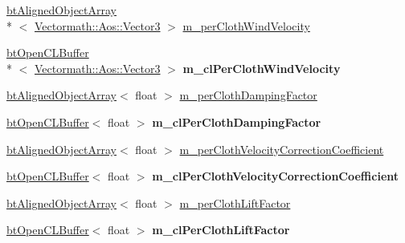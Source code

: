 \begin{DoxyCompactItemize}
\item 
\hyperlink{classbt_aligned_object_array}{bt\+Aligned\+Object\+Array}\\*
$<$ \hyperlink{class_vectormath_1_1_aos_1_1_vector3}{Vectormath\+::\+Aos\+::\+Vector3} $>$ \hyperlink{classbt_open_c_l_soft_body_solver_a35942277432e994af4343e05746badf6}{m\+\_\+per\+Cloth\+Wind\+Velocity}
\item 
\hypertarget{classbt_open_c_l_soft_body_solver_ac2943803f63a8436fbc6ccff46f09f85}{\hyperlink{classbt_open_c_l_buffer}{bt\+Open\+C\+L\+Buffer}\\*
$<$ \hyperlink{class_vectormath_1_1_aos_1_1_vector3}{Vectormath\+::\+Aos\+::\+Vector3} $>$ {\bfseries m\+\_\+cl\+Per\+Cloth\+Wind\+Velocity}}\label{classbt_open_c_l_soft_body_solver_ac2943803f63a8436fbc6ccff46f09f85}

\item 
\hyperlink{classbt_aligned_object_array}{bt\+Aligned\+Object\+Array}$<$ float $>$ \hyperlink{classbt_open_c_l_soft_body_solver_aadcf2cae029a38caf6251ef3546eaae9}{m\+\_\+per\+Cloth\+Damping\+Factor}
\item 
\hypertarget{classbt_open_c_l_soft_body_solver_a90caa19599f9fc38d2c635e945004780}{\hyperlink{classbt_open_c_l_buffer}{bt\+Open\+C\+L\+Buffer}$<$ float $>$ {\bfseries m\+\_\+cl\+Per\+Cloth\+Damping\+Factor}}\label{classbt_open_c_l_soft_body_solver_a90caa19599f9fc38d2c635e945004780}

\item 
\hyperlink{classbt_aligned_object_array}{bt\+Aligned\+Object\+Array}$<$ float $>$ \hyperlink{classbt_open_c_l_soft_body_solver_a31b8a875bb67fe9b9de3a0a656ded155}{m\+\_\+per\+Cloth\+Velocity\+Correction\+Coefficient}
\item 
\hypertarget{classbt_open_c_l_soft_body_solver_aee660d692582b31f2c437acbf351e3a6}{\hyperlink{classbt_open_c_l_buffer}{bt\+Open\+C\+L\+Buffer}$<$ float $>$ {\bfseries m\+\_\+cl\+Per\+Cloth\+Velocity\+Correction\+Coefficient}}\label{classbt_open_c_l_soft_body_solver_aee660d692582b31f2c437acbf351e3a6}

\item 
\hyperlink{classbt_aligned_object_array}{bt\+Aligned\+Object\+Array}$<$ float $>$ \hyperlink{classbt_open_c_l_soft_body_solver_a1c3736aaf3782d8992d423994aefc687}{m\+\_\+per\+Cloth\+Lift\+Factor}
\item 
\hypertarget{classbt_open_c_l_soft_body_solver_a656c178aeda89592b62ef8106d4305ed}{\hyperlink{classbt_open_c_l_buffer}{bt\+Open\+C\+L\+Buffer}$<$ float $>$ {\bfseries m\+\_\+cl\+Per\+Cloth\+Lift\+Factor}}\label{classbt_open_c_l_soft_body_solver_a656c178aeda89592b62ef8106d4305ed}


\end{DoxyCompactItemize}
